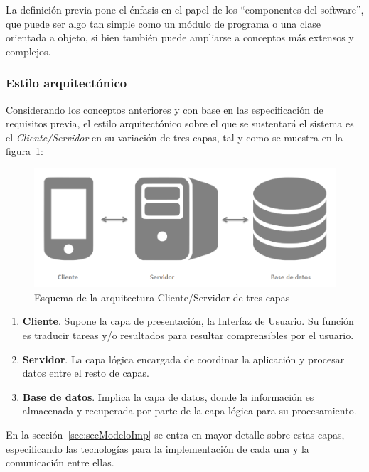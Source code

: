 La definición previa pone el énfasis en el papel de los ``componentes del software'', que puede ser algo tan simple como un módulo de programa o una clase orientada a objeto, si bien también puede ampliarse a conceptos más extensos y complejos.

\subsubsection{Estilo arquitectónico}

Considerando los conceptos anteriores y con base en las especificación de requisitos previa, el estilo arquitectónico sobre el que se sustentará el sistema es el \emph{Cliente/Servidor} en su variación de tres capas, tal y como se muestra en la figura~\ref{fig:arqClienteServ3Cap}:

\begin{figure}
	\centering
	\includegraphics[width=\linewidth,height=\textheight,keepaspectratio]{Images/ArqClienteServ3Cap}
	\caption{Esquema de la arquitectura Cliente/Servidor de tres capas}
	\label{fig:arqClienteServ3Cap}
\end{figure}

\begin{enumerate}
	\item \textbf{Cliente}. Supone la capa de presentación, la Interfaz de Usuario. Su función es traducir tareas y/o resultados para resultar comprensibles por el usuario.
	\item \textbf{Servidor}. La capa lógica encargada de coordinar la aplicación y procesar datos entre el resto de capas.
	\item \textbf{Base de datos}. Implica la capa de datos, donde la información es almacenada y recuperada por parte de la capa lógica para su procesamiento.
\end{enumerate}

En la sección~\ref{sec:secModeloImp} se entra en mayor detalle sobre estas capas, especificando las tecnologías para la implementación de cada una y la comunicación entre ellas.

